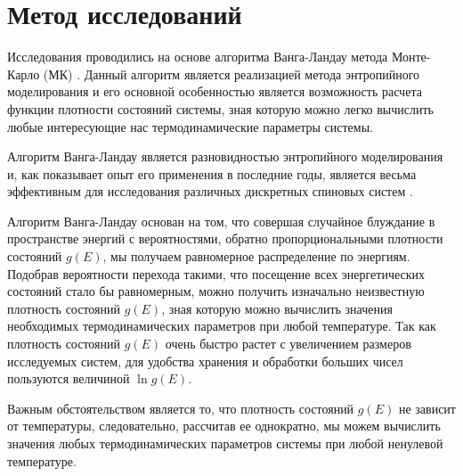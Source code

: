 \section{Метод исследований}

Исследования проводились на основе алгоритма Ванга-Ландау метода Монте-Карло (МК) \cite{mma-bib-10, mma-bib-11, mma-bib-12, mma-bib-13, mma-bib-14, mma-bib-15}. Данный алгоритм является реализацией метода энтропийного моделирования и его основной особенностью является возможность расчета функции плотности состояний системы, зная которую можно легко вычислить любые интересующие нас термодинамические параметры системы.

Алгоритм Ванга-Ландау является разновидностью энтропийного моделирования и, как показывает опыт его применения в последние годы, является весьма эффективным для исследования различных дискретных спиновых систем \cite{mma-bib-14}.

Алгоритм Ванга-Ландау основан на том, что совершая случайное блуждание в пространстве энергий с вероятностями, обратно пропорциональными плотности состояний $g(E)$, мы получаем равномерное распределение по энергиям. Подобрав вероятности перехода такими, что посещение всех энергетических состояний стало бы равномерным, можно получить изначально неизвестную плотность состояний $g(E)$, зная которую можно вычислить значения необходимых термодинамических параметров при любой температуре. Так как плотность состояний $g(E)$ очень быстро растет с увеличением размеров исследуемых систем, для удобства хранения и обработки больших чисел пользуются величиной $\ln g(E)$.

Важным обстоятельством является то, что плотность состояний $g(E)$ не зависит от температуры, следовательно, рассчитав ее однократно, мы можем вычислить значения любых термодинамических параметров системы при любой ненулевой температуре.

